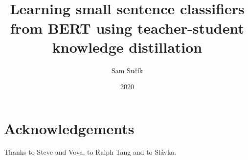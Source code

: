 \documentclass[bsc,frontabs,twoside,singlespacing,parskip,deptreport]{infthesis}
\begin{document}
\title{\vspace{-5.0cm}  \vspace{1cm} \\ Learning small sentence classifiers from BERT using teacher-student knowledge distillation}

\author{Sam Su\v{c}\'ik}

\project{\vspace{3cm}{\bf MInf Project (Part 2) Report}}

\date{2020}

\abstract{
  
}

\maketitle

\section*{Acknowledgements}{
  Thanks to Steve and Vova, to Ralph Tang and to Sl\'avka.
}

{
  \hypersetup{linkcolor=black}
  \tableofcontents
}
\end{document}
